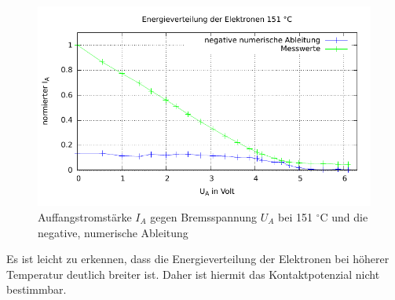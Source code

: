 \begin{figure}[H]
 \includegraphics[width=0.8 \textwidth]{pics/energie151.pdf}
 \caption{Auffangstromstärke $I_A$ gegen Bremsspannung $U_A$ bei 151 $^{\circ}$C und die negative, numerische Ableitung}
 \label{pic_energie151}
\end{figure}

Es ist leicht zu erkennen, dass die Energieverteilung der Elektronen bei höherer Temperatur deutlich breiter ist. Daher ist hiermit
das Kontaktpotenzial nicht bestimmbar.

